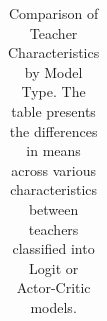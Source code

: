 \documentclass[
  number,
  preprint,
  3p,
  onecolumn]{elsarticle}
\begin{document}
\begin{longtable}[]{@{}
  >{\raggedright\arraybackslash}p{}
  >{\centering\arraybackslash}p{}
  >{\centering\arraybackslash}p{}
  >{\centering\arraybackslash}p{}
  >{\centering\arraybackslash}p{}
  >{\centering\arraybackslash}p{}
  >{\centering\arraybackslash}p{}@{}}

\caption{\label{tbl-CBM-teachers}Comparison of Teacher Characteristics
by Model Type. The table presents the differences in means across
various characteristics between teachers classified into Logit or
Actor-Critic models.}

\tabularnewline


\end{longtable}
\end{document}
